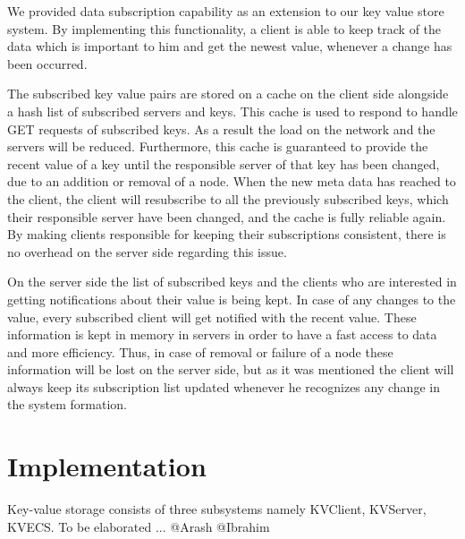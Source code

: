 \documentclass{sig-alternate}
\begin{document}
We provided data subscription capability as an extension to our key value store system. By implementing  this functionality, a client is able to keep track of the data which is important to him and get the newest value, whenever a change has been occurred. 

The subscribed key value pairs are stored on a cache on the client side alongside a hash list of subscribed servers and keys. This cache is used to respond to handle GET requests of subscribed keys. As a result the load on the network and the servers will be reduced. Furthermore, this cache is guaranteed to provide the recent value of a key until the responsible server of that key has been changed, due to an addition or removal of a node. When the new meta data has reached to the client, the client will resubscribe to all the previously subscribed keys, which their responsible server have been changed, and the cache is fully reliable again. By making clients responsible for keeping their subscriptions consistent, there is no overhead on the server side regarding this issue.

On the server side the list of subscribed keys and the clients who are interested in getting notifications about their value is being kept. In case of any changes to the value, every subscribed client will get notified with the recent value. These information is kept in memory in servers in order to have a fast access to data and more efficiency. Thus, in case of removal or failure of a node these information will be lost on the server side, but as it was mentioned the client will always keep its subscription list updated whenever he recognizes any change in the system formation.


\section{Implementation}
Key-value storage consists of three subsystems namely KVClient, KVServer, KVECS. 
To be elaborated ... @Arash @Ibrahim
\end{document}
